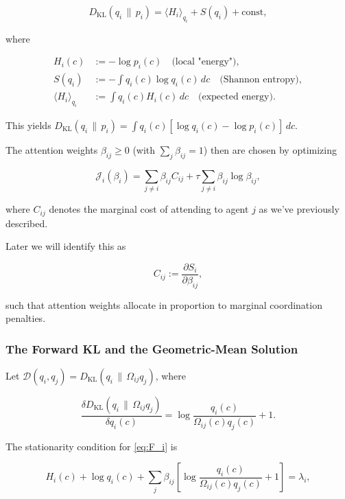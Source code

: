 \documentclass[twoside,11pt]{article}
\begin{document}
\begin{equation}
D_{\mathrm{KL}}(q_i \,\|\, p_i) = \langle H_i \rangle_{q_i} + S(q_i) + \text{const},
\end{equation}

where

\begin{align}
H_i(c) &:= -\log p_i(c) \quad \text{(local "energy")}, \\
S(q_i) &:= -\int q_i(c) \log q_i(c)\,dc \quad \text{(Shannon entropy)}, \\
\langle H_i \rangle_{q_i} &:= \int q_i(c) H_i(c)\,dc \quad \text{(expected energy)}.
\end{align}

This yields $D_{\mathrm{KL}}(q_i \,\|\, p_i) = \int q_i(c)[\log q_i(c) - \log p_i(c)]\,dc$.

The attention weights $\beta_{ij}\ge 0$ (with $\sum_j \beta_{ij}=1$) then are chosen by optimizing

\begin{equation}
\mathcal{J}_i(\beta_i)
=\sum_{j\neq i}\beta_{ij} C_{ij}
+ \tau \sum_{j\neq i}\beta_{ij}\log\beta_{ij},
\label{eq:J_i}
\end{equation}

where $C_{ij}$ denotes the marginal cost of attending to agent $j$ as we've previously described.

Later we will identify this as 

\begin{equation}
C_{ij} := \frac{\partial S_i}{\partial \beta_{ij}},
\end{equation}

such that attention weights allocate in proportion to marginal coordination penalties.

\subsubsection{The Forward KL and the Geometric-Mean Solution}
Let $\mathcal{D}(q_i,q_j) = D_{\mathrm{KL}}(q_i \,\|\, \Omega_{ij} q_j)$, where

\[
\frac{\delta D_{\mathrm{KL}}(q_i \,\|\, \Omega_{ij} q_j)}{\delta q_i(c)} 
= \log\frac{q_i(c)}{\Omega_{ij}(c) q_j(c)} + 1.
\]

The stationarity condition for \eqref{eq:F_i} is

\begin{equation}
H_i(c)
+ \log q_i(c)
+ \sum_j \beta_{ij}
\!\left[
\log\frac{q_i(c)}{\Omega_{ij}(c)q_j(c)}+1
\right]
= \lambda_i,
\end{equation}
\end{document}
